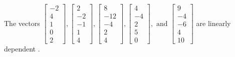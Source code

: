 \begin{exercise}
\begin{exerciseStatement}
  \end{exerciseStatement}
  \begin{exerciseAnswer}
   The vectors \(\left[\begin{array}{r}
-2 \\
4 \\
1 \\
0 \\
2
\end{array}\right] , \left[\begin{array}{r}
2 \\
-2 \\
-1 \\
1 \\
4
\end{array}\right] , \left[\begin{array}{r}
8 \\
-12 \\
-4 \\
2 \\
4
\end{array}\right] , \left[\begin{array}{r}
4 \\
-4 \\
2 \\
5 \\
0
\end{array}\right] , \text{ and } \left[\begin{array}{r}
9 \\
-4 \\
-6 \\
4 \\
10
\end{array}\right]\) are 
  	 linearly dependent  .
  


  \end{exerciseAnswer}
\end{exercise}